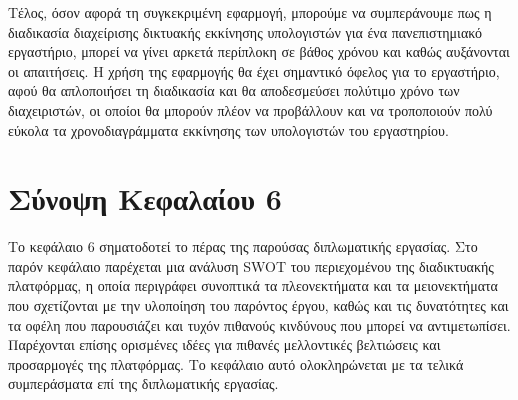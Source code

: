 Τέλος, όσον αφορά τη συγκεκριμένη εφαρμογή, μπορούμε να συμπεράνουμε πως η διαδικασία διαχείρισης δικτυακής εκκίνησης υπολογιστών για ένα πανεπιστημιακό εργαστήριο, μπορεί να γίνει αρκετά περίπλοκη σε βάθος χρόνου και καθώς αυξάνονται οι απαιτήσεις. Η χρήση της εφαρμογής θα έχει σημαντικό όφελος για το εργαστήριο, αφού θα απλοποιήσει τη διαδικασία και θα αποδεσμεύσει πολύτιμο χρόνο των διαχειριστών, οι οποίοι θα μπορούν πλέον να προβάλλουν και να τροποποιούν πολύ εύκολα τα χρονοδιαγράμματα εκκίνησης των υπολογιστών του εργαστηρίου.

\section{Σύνοψη Κεφαλαίου 6}
Το κεφάλαιο 6 σηματοδοτεί το πέρας της παρούσας διπλωματικής εργασίας. Στο παρόν κεφάλαιο παρέχεται μια ανάλυση SWOT του περιεχομένου της διαδικτυακής πλατφόρμας, η οποία περιγράφει συνοπτικά τα πλεονεκτήματα και τα μειονεκτήματα που σχετίζονται με την υλοποίηση του παρόντος έργου, καθώς και τις δυνατότητες και τα οφέλη που παρουσιάζει και τυχόν πιθανούς κινδύνους που μπορεί να αντιμετωπίσει. Παρέχονται επίσης ορισμένες ιδέες για πιθανές μελλοντικές βελτιώσεις και προσαρμογές της πλατφόρμας. Το κεφάλαιο αυτό ολοκληρώνεται με τα τελικά συμπεράσματα επί της διπλωματικής εργασίας.
